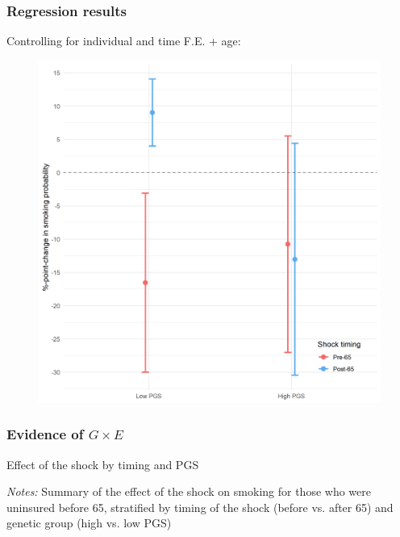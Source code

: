 \documentclass[10pt,compress,xcolor=dvipsnames,aspectratio=169]{beamer}    %
\newcounter{ex}
\newcommand{\1}[1]{\mathrm{1\hspace*{-2.5pt}l}[#1]}	%
\begin{document}
\begin{frame}
\frametitle{Regression results}
Controlling for individual and time F.E. + age:

\begin{figure}[hbtp]
\centering
\includegraphics[height=0.8\textheight]{../../3_output/shock_effects/main_6070_100_cvplot.png}
\label{fig:maincoeffplot}
\end{figure}
\hyperlink{frame:fullreg}{}

\end{frame}

\begin{frame}
\frametitle{Evidence of $G \times E$} \label{frame:regtab}

\begin{table}[ht]
	\caption{Effect of the shock by timing and PGS}
	\small\resizebox{0.9\textheight}{!}{
	
	}

	\vspace{1ex}
	{\raggedright \tiny \textit{Notes:} Summary of the effect of the shock on smoking for those who were uninsured before 65, stratified by timing of the shock (before vs. after 65) and genetic group (high vs. low PGS) \par}

\end{table}


\end{frame}
\end{document}
